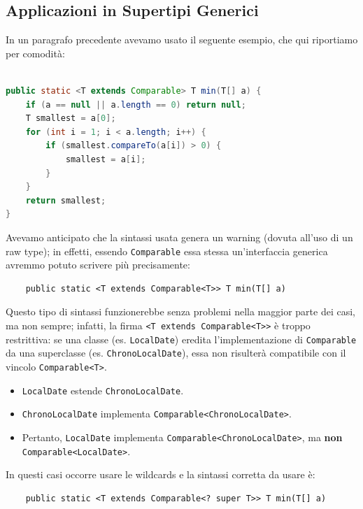 \subsection{Applicazioni in Supertipi Generici}
\label{app super gen}
In un paragrafo precedente avevamo usato il seguente esempio, che qui riportiamo per comodità: 
\begin{lstlisting}[language=Java]
    
public static <T extends Comparable> T min(T[] a) {
    if (a == null || a.length == 0) return null;
    T smallest = a[0];
    for (int i = 1; i < a.length; i++) {
        if (smallest.compareTo(a[i]) > 0) {
            smallest = a[i];
        }
    }
    return smallest;
}
\end{lstlisting}
Avevamo anticipato che la sintassi usata genera un warning (dovuta all'uso di un raw type); in effetti, essendo \texttt{Comparable} essa stessa un'interfaccia generica avremmo potuto scrivere più precisamente: 
\begin{lstlisting}
    public static <T extends Comparable<T>> T min(T[] a)
\end{lstlisting}
Questo tipo di sintassi funzionerebbe senza problemi nella maggior parte dei casi, ma non sempre; infatti, la firma \texttt{<T extends Comparable<T>>} è troppo restrittiva: se una classe (es. \texttt{LocalDate}) eredita l'implementazione di \texttt{Comparable} da una superclasse (es. \texttt{ChronoLocalDate}), essa non risulterà compatibile con il vincolo \texttt{Comparable<T>}.

\begin{dettagli}
    \begin{itemize}
        \item \texttt{LocalDate} estende \texttt{ChronoLocalDate}.
        \item \texttt{ChronoLocalDate} implementa \texttt{Comparable<ChronoLocalDate>}.
        \item Pertanto, \texttt{LocalDate} implementa \texttt{Comparable<ChronoLocalDate>}, ma \textbf{non} \texttt{Comparable<LocalDate>}.
    \end{itemize}
\end{dettagli}

In questi casi occorre usare le wildcards e la sintassi corretta da usare è:
\begin{lstlisting}
    public static <T extends Comparable<? super T>> T min(T[] a)
\end{lstlisting}

